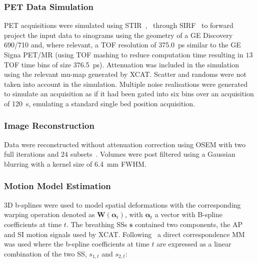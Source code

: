            \subsubsection{PET Data Simulation} \label{sec:impact_of_tof_on_respiratory_motion_modelling_using_nac_pet_methods_pet_data_simulation}
                \gls{PET} acquisitions were simulated using \gls{STIR}~,~ through \gls{SIRF}~ to forward project the input data to sinograms using the geometry of a \gls{GE} Discovery 690/710 and, where relevant, a \gls{TOF} resolution of \SI{375.0}{\pico\second} similar to the \gls{GE} Signa \gls{PET}/\gls{MR} (using \gls{TOF} mashing to reduce computation time resulting in $13$ \gls{TOF} time bins of size \SI{376.5}{\pico\second}). Attenuation was included in the simulation using the relevant \gls{mu-map} generated by \gls{XCAT}. Scatter and randoms were not taken into account in the simulation. Multiple noise realisations were generated to simulate an acquisition as if it had been gated into six bins over an acquisition of \SI{120}{\second}, emulating a standard single bed position acquisition. 
            
            \subsubsection{Image Reconstruction} \label{sec:impact_of_tof_on_respiratory_motion_modelling_using_nac_pet_methods_image_reconstruction}
                Data were reconstructed without attenuation correction using \gls{OSEM} with two full iterations and $24$ subsets~. Volumes were post filtered using a Gaussian blurring with a kernel size of \SI{6.4}{\milli\metre} \gls{FWHM}.
            
            \subsubsection{Motion Model Estimation} \label{sec:impact_of_tof_on_respiratory_motion_modelling_using_nac_pet_methods_motion_model_estimation}
                \gls{3D} b-splines were used to model spatial deformations with the corresponding warping operation denoted as $\mathbf{W}(\mathbf{\alpha}_t)$, with $\mathbf{\alpha}_t$ a vector with B-spline coefficients at time $t$. The breathing \gls{SS}s $\mathbf{s}$ contained two components, the \gls{AP} and \gls{SI} motion signals used by \gls{XCAT}. Following~ a direct correspondence \gls{MM} was used where the b-spline coefficients at time $t$ are expressed as a linear combination of the two \gls{SS}, $s_{1,t}$ and $s_{2,t}$:
            
